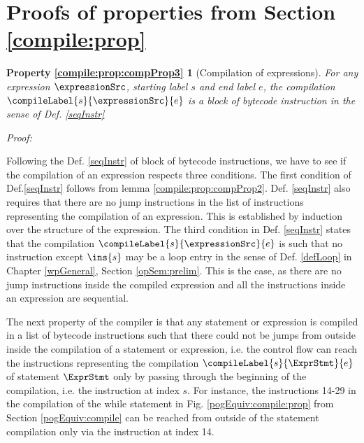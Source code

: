 \newtheorem{compPropApp}{Lemma}[section]


\newtheorem*{compProp3A}{Property  \ref{compile:prop:compProp3}}
\newtheorem*{compProp8A}{Property  \ref{compile:prop:compProp8}}


\section{Proofs of properties from Section \ref{compile:prop} }\label{appendix:compile:prop}




\begin{compProp3A}[Compilation of expressions]
    For any expression $\expressionSrc$, starting label $s$ and end label $e$,
    the compilation $\compileLabel{s}{\expressionSrc}{e}$ is a block of bytecode instruction in the sense of Def. \ref{seqInstr}
   
\end{compProp3A}
\textit{Proof:}

Following the Def. \ref{seqInstr} of block of bytecode instructions,  we have to see if the compilation of an expression respects
three conditions.
The first condition of Def.\ref{seqInstr}  follows from lemma \ref{compile:prop:compProp2}. 
Def. \ref{seqInstr} also requires that there are no jump instructions  in the list of instructions representing the  compilation of an expression.
This is established by induction over the structure of the expression.
The third condition in Def. \ref{seqInstr} states that  the compilation $\compileLabel{s}{\expressionSrc}{e}$ is such that 
  no instruction except $\ins{s}$ may be  a loop entry  in the sense of Def.  \ref{defLoop} in Chapter
\ref{wpGeneral}, Section \ref{opSem:prelim}. This is the case, as there are no jump instructions inside the compiled expression  and all the instructions inside an
expression are sequential.\\
\Qed 

The next  property  of the compiler is that any statement or expression   is
 compiled in a list of bytecode instructions 
such that there could not be jumps  from outside inside the compilation of a statement or expression, i.e.
the control flow can reach the instructions representing the compilation $\compileLabel{s}{\ExprStmt}{e}$ 
 of statement $\ExprStmt$  only by passing   through the beginning of the compilation, i.e. the instruction at index $s$. 
 For instance, the instructions 14-29 in the compilation of the while statement
 in Fig. \ref{pogEquiv:compile:prop} from Section \ref{pogEquiv:compile}  
 can be reached from outside of the statement compilation only via the instruction at index 14.

